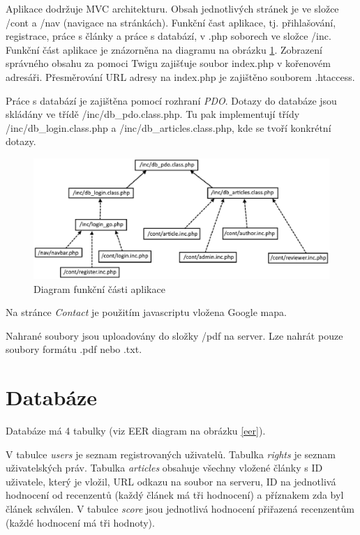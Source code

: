 Aplikace dodržuje MVC architekturu. Obsah jednotlivých stránek je ve složce /cont a /nav (navigace na stránkách). Funkční čast aplikace, tj. přihlašování, registrace, práce s články a práce s databází, v .php soborech ve složce /inc. Funkční část aplikace je znázorněna na diagramu na obrázku \ref{uml}. Zobrazení správného obsahu za pomoci Twigu zajišťuje soubor index.php v kořenovém adresáři. Přesměrování URL adresy na index.php je zajištěno souborem .htaccess.

Práce s databází je zajištěna pomocí rozhraní \emph{PDO}. Dotazy do databáze jsou skládány ve třídě /inc/db\_pdo.class.php. Tu pak implementují třídy /inc/db\_login.class.php a /inc/db\_articles.class.php, kde se tvoří konkrétní dotazy.

\begin{figure}[H]
	\centering
	\includegraphics[width=1\textwidth]{img/UML.eps}
	\caption{Diagram funkční části aplikace}
  \label{uml}
\end{figure}


Na stránce \emph{Contact} je použitím javascriptu vložena Google mapa.

Nahrané soubory jsou uploadovány do složky /pdf na server. Lze nahrát pouze soubory formátu .pdf nebo .txt.


\section{Databáze}

Databáze má 4 tabulky (viz EER diagram na obrázku \ref{eer}).

V tabulce \emph{users} je seznam registrovaných uživatelů. Tabulka \emph{rights} je seznam uživatelských práv. Tabulka \emph{articles} obsahuje všechny vložené články s ID uživatele, který je vložil, URL odkazu na soubor na serveru, ID na jednotlivá hodnocení od recenzentů (každý článek má tři hodnocení) a příznakem zda byl článek schválen. V tabulce \emph{score} jsou jednotlivá hodnocení přiřazená recenzentům (každé hodnocení má tři hodnoty).

